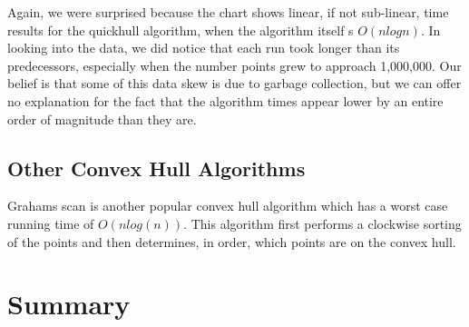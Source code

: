 \documentclass[11pt]{article}
\begin{document}
Again, we were surprised because the chart shows linear, if not sub-linear, time results for the quickhull algorithm, when the algorithm itself s $O(n log n)$. In looking into the data, we did notice that each run took longer than its predecessors, especially when the number points grew to approach 1,000,000. Our belief is that some of this data skew is due to garbage collection, but we can offer no explanation for the fact that the algorithm times appear lower by an entire order of magnitude than they are.

\subsection{Other Convex Hull Algorithms}
Grahams scan is another popular convex hull algorithm which has a worst case running time of $O(nlog(n))$. This algorithm first performs a clockwise sorting of the points and then determines, in order, which points are on the convex hull.

\section{Summary}

\nocite{Princeton:QH}
\nocite{CLRS}



\end{document}
